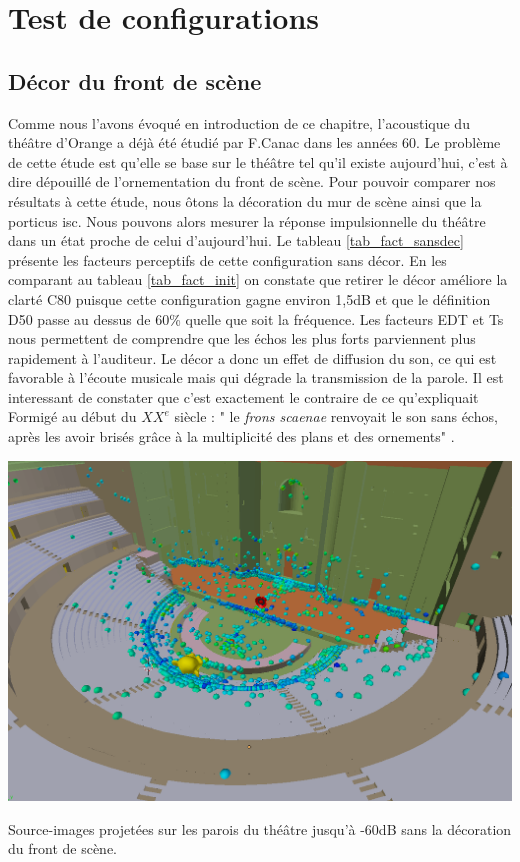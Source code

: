		
\chapter{Test de configurations}
	\minitoc
	\newpage

\section{Décor du front de scène}

Comme nous l'avons évoqué en introduction de ce chapitre, l'acoustique du théâtre d'Orange a déjà été étudié par F.Canac dans les années 60. Le problème de cette étude est qu'elle se base sur le théâtre tel qu'il existe aujourd'hui, c'est à dire dépouillé de l'ornementation du front de scène. Pour pouvoir comparer nos résultats à cette étude, nous ôtons la décoration du mur de scène ainsi que la \gls{porticus isc}. Nous pouvons alors mesurer la réponse impulsionnelle du théâtre dans un état proche de celui d'aujourd'hui. Le tableau \ref{tab_fact_sansdec} présente les facteurs perceptifs de cette configuration sans décor. En les comparant au tableau \ref{tab_fact_init} on constate que retirer le décor améliore la clarté  \gls{C80} puisque cette configuration gagne environ 1,5dB et que le définition \gls{D50} passe au dessus de 60\% quelle que soit la fréquence. Les facteurs \gls{EDT} et \gls{Ts} nous permettent de comprendre que les échos les plus forts parviennent plus rapidement à l'auditeur. Le décor a donc un effet de diffusion du son, ce qui est favorable à l'écoute musicale mais qui dégrade la transmission de la parole. Il est interessant de constater que c'est exactement le contraire de ce qu'expliquait Formigé au début du $XX^e$ siècle : " le \textit{frons scaenae} renvoyait le son sans échos, après les avoir brisés grâce à la multiplicité des plans et des ornements" \cite[p.43]{formige}.

\begin{figureth}
	\includegraphics[width=\linewidth]{images/SIsansDec}
	\caption{Source-images projetées sur les parois du théâtre jusqu'à -60dB sans la décoration du front de scène.}
	\label{SIsansDec}
\end{figureth}

